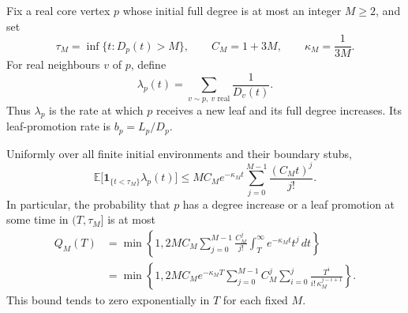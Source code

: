 Fix a real core vertex $p$ whose initial full degree is at most an
integer $M\ge2$, and set
\[
 \tau_M=\inf\{t:D_p(t)>M\},\qquad
 C_M=1+3M,\qquad \kappa_M=\frac1{3M}.
\]
For real neighbours $v$ of $p$, define
\[
 \lambda_p(t)=\sum_{v\sim p,\ v\text{ real}}\frac1{D_v(t)}.
\]
Thus $\lambda_p$ is the rate at which $p$ receives a new leaf and
its full degree increases.  Its leaf-promotion rate is
$b_p=L_p/D_p$.

\begin{theorem}
\label{ps:stabilization}
Uniformly over all finite initial environments and their boundary stubs,
\begin{equation}\label{ps:rate-bound}
 \mathbb E\bigl[\mathbf1_{\{t<\tau_M\}}\lambda_p(t)\bigr]
 \le M C_M e^{-\kappa_Mt}
       \sum_{j=0}^{M-1}\frac{(C_Mt)^j}{j!}.
\end{equation}
In particular, the probability that $p$ has a degree increase or a leaf
promotion at some time in $(T,\tau_M]$ is at most
\begin{align}
 Q_M(T)
 &=\min\left\{1,
 2M C_M\sum_{j=0}^{M-1}\frac{C_M^j}{j!}
       \int_T^\infty e^{-\kappa_Mt}t^j\,dt\right\}
 \label{ps:tail-integral}\\
 &=\min\left\{1,
 2M C_M e^{-\kappa_MT}
 \sum_{j=0}^{M-1}C_M^j
       \sum_{i=0}^j\frac{T^i}{i!\,\kappa_M^{j-i+1}}
 \right\}.
 \label{ps:tail-explicit}
\end{align}
This bound tends to zero exponentially in $T$ for each fixed $M$.
\end{theorem}
